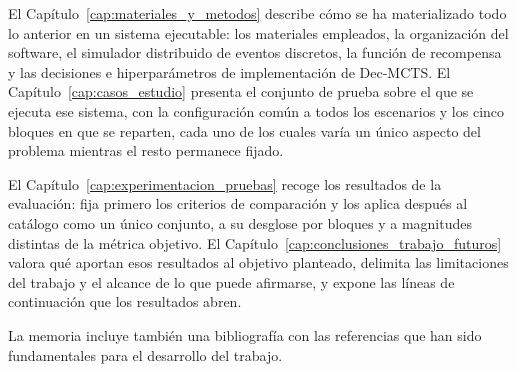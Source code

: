 El Capítulo~\ref{cap:materiales_y_metodos} describe cómo se ha materializado todo lo anterior en un sistema ejecutable: los materiales empleados, la organización del software, el simulador distribuido de eventos discretos, la función de recompensa y las decisiones e hiperparámetros de implementación de Dec-MCTS. El Capítulo~\ref{cap:casos_estudio} presenta el conjunto de prueba sobre el que se ejecuta ese sistema, con la configuración común a todos los escenarios y los cinco bloques en que se reparten, cada uno de los cuales varía un único aspecto del problema mientras el resto permanece fijado.

El Capítulo~\ref{cap:experimentacion_pruebas} recoge los resultados de la evaluación: fija primero los criterios de comparación y los aplica después al catálogo como un único conjunto, a su desglose por bloques y a magnitudes distintas de la métrica objetivo. El Capítulo~\ref{cap:conclusiones_trabajo_futuros} valora qué aportan esos resultados al objetivo planteado, delimita las limitaciones del trabajo y el alcance de lo que puede afirmarse, y expone las líneas de continuación que los resultados abren.

La memoria incluye también una bibliografía con las referencias que han sido fundamentales para el desarrollo del trabajo.
